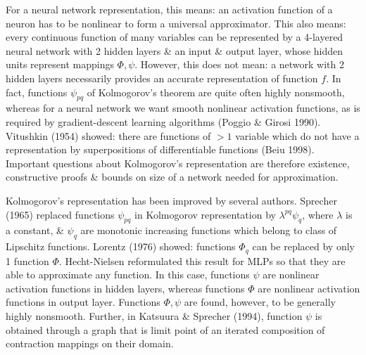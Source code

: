 \documentclass{article}
\begin{document}
\begin{enumerate}
\begin{itemize}
\begin{itemize}
			For a neural network representation, this means: an activation function of a neuron has to be nonlinear to form a universal approximator. This also means: every continuous function of many variables can be represented by a 4-layered neural network with 2 hidden layers \& an input \& output layer, whose hidden units represent mappings $\Phi,\psi$. However, this does not mean: a network with 2 hidden layers necessarily provides an accurate representation of function $f$. In fact, functions $\psi_{pq}$ of {\sc Kolmogorov}'s theorem are quite often highly nonsmooth, whereas for a neural network we want smooth nonlinear activation functions, as is required by gradient-descent learning algorithms (Poggio \& Girosi 1990). Vitushkin (1954) showed: there are functions of $> 1$ variable which do not have a representation by superpositions of differentiable functions (Beiu 1998). Important questions about {\sc Kolmogorov}'s representation are therefore existence, constructive proofs \& bounds on size of a network needed for approximation.
			
			{\sc Kolmogorov}'s representation has been improved by several authors. Sprecher (1965) replaced functions $\psi_{pq}$ in {\sc Kolmogorov representation} by $\lambda^{pq}\psi_q$, where $\lambda$ is a constant, \& $\psi_q$ are monotonic increasing functions which belong to class of Lipschitz functions. Lorentz (1976) showed: functions $\Phi_q$ can be replaced by only 1 function $\Phi$. Hecht-Nielsen reformulated this result for MLPs so that they are able to approximate any function. In this case, functions $\psi$ are nonlinear activation functions in hidden layers, whereas functions $\Phi$ are nonlinear activation functions in output layer. Functions $\Phi,\psi$ are found, however, to be generally highly nonsmooth. Further, in Katsuura \& Sprecher (1994), function $\psi$ is obtained through a graph that is limit point of an iterated composition of contraction mappings on their domain.
			

\end{itemize}
\end{itemize}
\end{enumerate}
\end{document}
